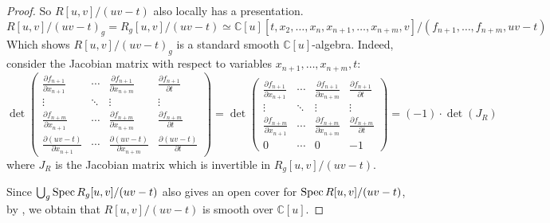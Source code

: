 \begin{remark}[\textcolor{red}{Warning}]
\begin{proof}
        So $R[u,v]/(uv-t)$ also locally has a presentation.
        $$
            R[u,v]/(uv-t)_g = R_g[u,v]/(uv-t) \simeq \mathbb{C}[u][t, x_2, \ldots, x_n, x_{n+1}, \ldots, x_{n+m}, v]/(f_{n+1}, \ldots, f_{n+m}, uv-t)
        $$
        Which shows $R[u,v]/(uv-t)_g$ is a standard smooth $\mathbb{C}[u]$-algebra. Indeed, consider the Jacobian matrix with respect to variables $x_{n+1}, \ldots, x_{n+m}, t$:
        $$
            \det \begin{pmatrix}
                \frac{\partial f_{n+1}}{\partial x_{n+1}} & \cdots & \frac{\partial f_{n+1}}{\partial x_{n+m}} & \frac{\partial f_{n+1}}{\partial t} \\
                \vdots                                    & \ddots & \vdots                                    & \vdots                              \\
                \frac{\partial f_{n+m}}{\partial x_{n+1}} & \cdots & \frac{\partial f_{n+m}}{\partial x_{n+m}} & \frac{\partial f_{n+m}}{\partial t} \\
                \frac{\partial (uv-t)}{\partial x_{n+1}}  & \cdots & \frac{\partial (uv-t)}{\partial x_{n+m}}  & \frac{\partial (uv-t)}{\partial t}
            \end{pmatrix}
            =
            \det \begin{pmatrix}
                \frac{\partial f_{n+1}}{\partial x_{n+1}} & \cdots & \frac{\partial f_{n+1}}{\partial x_{n+m}} & \frac{\partial f_{n+1}}{\partial t} \\
                \vdots                                    & \ddots & \vdots                                    & \vdots                              \\
                \frac{\partial f_{n+m}}{\partial x_{n+1}} & \cdots & \frac{\partial f_{n+m}}{\partial x_{n+m}} & \frac{\partial f_{n+m}}{\partial t} \\
                0                                         & \cdots & 0                                         & -1
            \end{pmatrix}
            = (-1) \cdot \det(J_R)
        $$
        where $J_R$ is the Jacobian matrix which is invertible in $R_g[u,v]/(uv-t)$.

        Since $\bigcup_g \operatorname{Spec} R_g[u,v]/(uv-t)$ also gives an open cover for $\operatorname{Spec} R[u,v]/(uv-t)$, by \cite[\href{https://stacks.math.columbia.edu/tag/00TC}{Tag 00TC}]{stacks-project}, we obtain that $R[u,v]/(uv-t)$ is smooth over $\mathbb{C}[u]$.

    \end{proof}

\end{remark}





